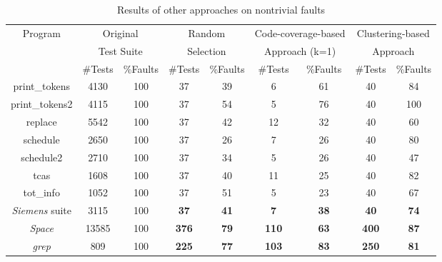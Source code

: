 \documentclass{sig-alternate}
\begin{document}
\begin{table}[htbp]
\caption{Results of other approaches on nontrivial
faults}\label{tab:other:nontrivial} \center
\begin{tabular}{|c|c|c|c|c|c|c|c|c|}

\hline Program   & \multicolumn{2}{c}{Original } \vline &
\multicolumn{2}{c}{Random} \vline &
\multicolumn{2}{c}{Code-coverage-based} \vline &
\multicolumn{2}{c}{Clustering-based} \vline     \\

& \multicolumn{2}{c}{Test Suite} \vline &
\multicolumn{2}{c}{Selection} \vline & \multicolumn{2}{c}{Approach
(k=1)} \vline &
\multicolumn{2}{c}{Approach} \vline     \\

 \cline{2-9}  & \#Tests &   \%Faults & \#Tests &   \%Faults &
\#Tests &   \%Faults & \#Tests &   \%Faults \\


\hline  print\_tokens   &   4130    &   100 &   37  &   39&   6   &   61  &   40  &   84  \\
\hline  print\_tokens2  &   4115    &   100 &   37  &   54&   5   &   76  &   40  &   100 \\
\hline  replace &   5542    &   100 &   37  &   42&   12  &   32  &   40  &   60  \\
\hline  schedule    &   2650    &   100 &   37  &   26&   7   &   26  &   40  &   80  \\
\hline  schedule2   &   2710    &   100 &   37  &   34&   5   &   26  &   40  &   47  \\
\hline  tcas    &   1608    &   100 &   37  &   40&   11  &   25  &   40  &   82  \\
\hline  tot\_info &   1052    &   100 &   37  &   51&   5   &   23  &   40  &   67  \\
\hline  \emph{Siemens} suite   &   3115    &   100 &   \textbf{37}  &   \textbf{41}&   \textbf{7}   &   \textbf{38}  &   \textbf{40}  &   \textbf{74}  \\
\hline  \emph{Space}   &   13585   &   100 &   \textbf{376} &   \textbf{79}&   \textbf{110} &   \textbf{63}  &   \textbf{400} &   \textbf{87}  \\
\hline  \emph{grep}    &   809 &   100 &   \textbf{225} &   \textbf{77}&   \textbf{103} &   \textbf{83}  &   \textbf{250} &   \textbf{81}  \\

\hline
\end{tabular}
\end{table}
\end{document}

